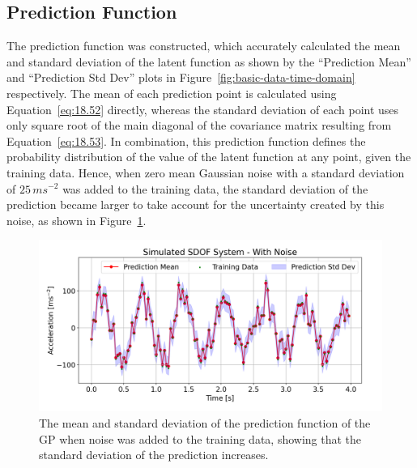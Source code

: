\documentclass[12pt]{article}
\begin{document}
    \subsection{Prediction Function}
    The prediction function was constructed, which accurately calculated the mean and standard deviation of the latent function as shown by the ``Prediction Mean'' and ``Prediction Std Dev'' plots in Figure~\ref{fig:basic-data-time-domain} respectively.
    The mean of each prediction point is calculated using Equation~\ref{eq:18.52} directly, whereas the standard deviation of each point uses only square root of the main diagonal of the covariance matrix resulting from Equation~\ref{eq:18.53}.
    In combination, this prediction function defines the probability distribution of the value of the latent function at any point, given the training data.
    Hence, when zero mean Gaussian noise with a standard deviation of $25 \, ms^{-2}$ was added to the training data, the standard deviation of the prediction became larger to take account for the uncertainty created by this noise, as shown in Figure~\ref{fig:noisy-data-time-domain}.



    \begin{figure}[h]
        \centering
        \includegraphics[width=1.0\linewidth]{figures/noisy-data-time-domain/noisy-data-time-domain.png}
        \caption{The mean and standard deviation of the prediction function of the GP when noise was added to the training data, showing that the standard deviation of the prediction increases.}
        \label{fig:noisy-data-time-domain}
    \end{figure}
\end{document}
